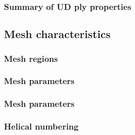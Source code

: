 \documentclass[first,firstsupp,lastsupp,handout,last,hyperref,table]{ETHclass}
\begin{document}
\begin{frame}
\frametitle{Summary of UD ply properties}
\centering

\end{frame}

\subsection{Mesh characteristics}


\begin{frame}
\frametitle{Mesh regions}
\vspace{-0.75cm}
\centering
\begin{figure}[!h]
\centering
  \label{fig:mesh_regions}
\end{figure}
\end{frame}


\begin{frame}
\frametitle{Mesh parameters}
\vspace{-0.75cm}
\centering
\begin{figure}[!h]
\centering
  \label{fig:mesh_param_single}
\end{figure}
\end{frame}

\begin{frame}
\frametitle{Mesh parameters}
\vspace{-0.75cm}
\centering
\begin{figure}[!h]
\centering
  \label{fig:mesh_param_bounded}
\end{figure}
\end{frame}

\begin{frame}
\frametitle{Helical numbering}
\vspace{-0.75cm}
\centering
\begin{figure}[!h]
\centering
  \label{fig:helix}
\end{figure}
\end{frame}
\end{document}
